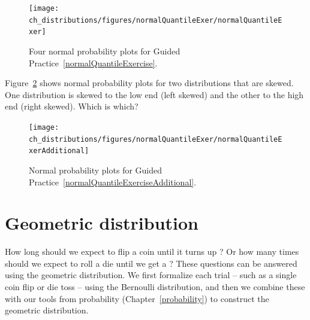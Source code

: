 \begin{figure}
\centering
\texttt{[image: ch\_distributions/figures/normalQuantileExer/normalQuantileExer]}
\caption{Four normal probability plots for Guided Practice~\ref{normalQuantileExercise}.}
\label{normalQuantileExer}
\end{figure}


\begin{exercisewrap}
\begin{nexercise}
\label{normalQuantileExerciseAdditional}%
Figure~\ref{normalQuantileExerAdditional} shows normal probability plots for two distributions that are skewed. One distribution is skewed to the low end (left skewed) and the other to the high end (right skewed). Which is which?\footnotemark
\end{nexercise}
\end{exercisewrap}

\begin{figure}
\centering
\texttt{[image: ch\_distributions/figures/normalQuantileExer/normalQuantileExerAdditional]}
\caption{Normal probability plots for Guided Practice~\ref{normalQuantileExerciseAdditional}.}
\label{normalQuantileExerAdditional}
\end{figure}




\section{Geometric distribution}
\label{geomDist}

How long should we expect to flip a coin until it turns up ? Or how many times should we expect to roll a die until we get a ? These questions can be answered using the geometric distribution. We first formalize each trial -- such as a single coin flip or die toss -- using the Bernoulli distribution, and then we combine these with our tools from probability (Chapter~\ref{probability}) to construct the geometric distribution.

